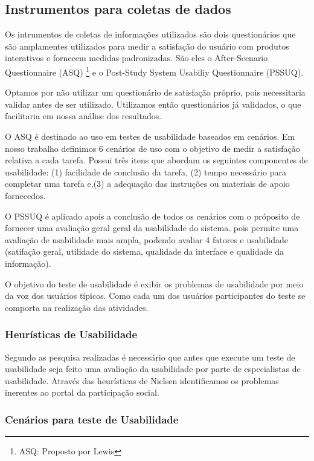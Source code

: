 \subsection{Instrumentos para coletas de dados}

	Os intrumentos de coletas de informações utilizados são dois questionários que são amplamentes utilizados para medir a satisfação do usuário com produtos interativos e fornecem medidas padronizadas. São eles o After-Scenario Questionnaire (ASQ) \footnote{ASQ: Proposto por Lewis} e o Post-Study System Usabiliy Questionnaire (PSSUQ). 

	Optamos por não utilizar um questionário de satisfação próprio, pois necessitaria validar antes de ser utilizado.  Utilizamos então questionários já validados, o que facilitaria em nossa análise dos resultados.

	O ASQ é destinado ao uso em testes de usabilidade baseados em cenários. Em nosso trabalho definimos 6 cenários de uso com o objetivo de medir a satisfação relativa a cada tarefa. Possui três itens que abordam os seguintes componentes de usabilidade: (1) facilidade de conclusão da tarefa, (2) tempo necessário para completar uma tarefa e,(3) a adequação das instruções ou materiais de apoio fornecedos.

	O PSSUQ é aplicado apois a conclusão de todos os cenários com o próposito de fornecer uma avaliação geral geral da usabilidade do sistema. pois permite uma avaliação de usabilidade mais ampla, podendo avaliar 4 fatores e usabilidade (satifação geral, utilidade do sistema, qualidade da interface e qualidade da informação). 

	O objetivo do teste de usabilidade é exibir os problemas de usabilidade por meio da voz dos usuários típicos. Como cada um dos usuários participantes do teste se comporta na realização das atividades.



\subsubsection{Heurísticas de Usabilidade}

	Segundo as pesquisa realizadas é necessário que antes que execute um teste de usabilidade seja feito uma avaliação da usabilidade por parte de especialistas de usabilidade. Através das heurísticas de Nielsen identificamos os problemas inerentes ao portal da participação social.


\subsubsection{Cenários para teste de Usabilidade}

